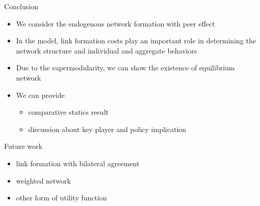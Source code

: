 \documentclass[10pt,dvipdfmx]{beamer}
\begin{document}
\begin{frame}{Conclusion}
\begin{itemize}
    \item We consider the endogenous network formation with peer effect
    \item In the model, link formation costs play an important role in determining the network structure and individual and aggregate behaviors
    \item Due to the supermodularity, we can show the existence of equilibrium network
    \item We can provide
    \begin{itemize}
        \item comparative statics result
        \item discussion about key player and policy implication
    \end{itemize}
\end{itemize}
\end{frame}

\begin{frame}{Future work}
\begin{itemize}
    \item link formation with bilateral agreement
    \item weighted network
    \item other form of utility function
\end{itemize}
\end{frame}
\end{document}
